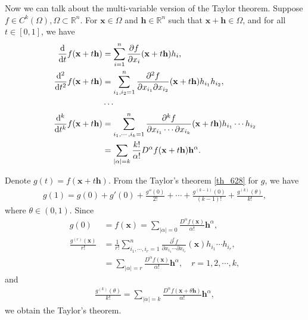 \documentclass[10pt]{book}
\theoremstyle{definition}
\numberwithin{equation}{chapter}
\begin{document}
\medskip

Now we can talk about the multi-variable version of the Taylor theorem. Suppose $f \in C^k(\Omega), \Omega \subset \mathbb{R}^n$. For $\mathbf{x} \in \Omega$ and $\mathbf{h} \in \mathbb{R}^n$ such that $\mathbf{x} + \mathbf{h} \in \Omega$, and for all $t \in [0,1]$, we have
\begin{align*}
    \dv{}{t}f(\mathbf{x} + t\mathbf{h}) & = \sum^n_{i=1} \frac{\partial f}{\partial x_i}(\mathbf{x} + t\mathbf{h}) h_i, \\
    \dv{^2}{t^2}f(\mathbf{x} + t\mathbf{h}) & = \sum^n_{i_1,i_2=1} \frac{\partial^2 f}{\partial x_{i_1} \partial x_{i_2}}(\mathbf{x} + t\mathbf{h}) h_{i_1} h_{i_2}, \\
    & \cdots \\
    \dv{^k}{t^k}f(\mathbf{x} + t\mathbf{h}) & = \sum^n_{i_1,\cdots,i_k=1} \frac{\partial^k f}{\partial x_{i_1} \cdots \partial x_{i_k}} (\mathbf{x} + t\mathbf{h}) h_{i_1} \cdots h_{i_2} \\
    & = \sum_{\left|\alpha\right|=k} \frac{k!}{\alpha!} D^{\alpha} f(\mathbf{x} + t\mathbf{h}) \mathbf{h}^{\alpha}.
\end{align*}

Denote $g(t) = f(\mathbf{x} + t\mathbf{h})$. From the Taylor's theorem \ref{th_628} for $g$, we have
\begin{align*}
    g(1) = g(0) + g'(0) + \frac{g''(0)}{2!} + \cdots + \frac{g^{(k-1)}(0)}{(k-1)!} + \frac{g^{(k)}(\theta)}{k!},
\end{align*}
where $\theta \in (0,1)$. Since
\begin{align*}
    g(0) & = f(\mathbf{x}) = \sum_{\left|\alpha\right|=0}  \frac{D^{\alpha} f(\mathbf{x})}{\alpha!} \mathbf{h}^{\alpha}, \\
    \frac{g^{(r)}(\mathbf{x})}{r!} & = \frac{1}{r!} \sum^n_{i_1,\cdots,i_r=1} \frac{\partial^r f}{\partial x_{i_1} \cdots \partial x_{i_r}}(\mathbf{x}) h_{i_1} \cdots h_{i_r}, \\
    & = \sum_{\left|\alpha\right| = r} \frac{D^{\alpha} f(\mathbf{x})}{\alpha!} \mathbf{h}^{\alpha}, \quad r = 1,2,\cdots,k,
\end{align*}
and
\begin{align*}
    \frac{g^{(k)}(\theta)}{k!} = \sum_{\left|\alpha\right| = k} \frac{D^{\alpha} f(\mathbf{x} + \theta \mathbf{h})}{\alpha!} \mathbf{h}^{\alpha},
\end{align*}
we obtain the Taylor's theorem.

\medskip
\end{document}
